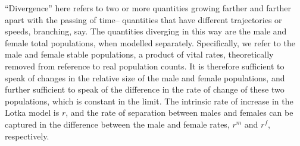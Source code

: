 \label{sec:Divergence}
``Divergence'' here refers to two or more quantities growing farther and
farther apart with the passing of time-- quantities that have different
trajectories or speeds, branching, say. The quantities diverging in this way are
the male and female total populations, when modelled separately. Specifically, we refer to
the male and female stable populations, a product of vital rates,
theoretically removed from reference to real population counts. It is therefore
sufficient to speak of changes in the relative size of the male and female
populations, and further sufficient to speak of the
difference in the rate of change of these two populations, which is constant in
the limit. The intrinsic rate of increase in the Lotka model is $r$, and the
rate of separation between males and females can be captured in the difference
between the male and female rates, $r^m$ and $r^f$, respectively.
